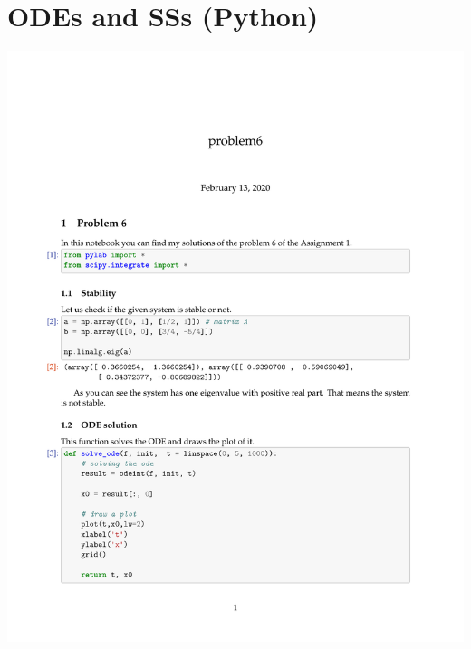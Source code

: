 \documentclass{article}
\begin{document}
\section{ODEs and SSs (Python)}
	\includegraphics[page=1,width=\textwidth]{problem6.pdf}
    
\end{document}
